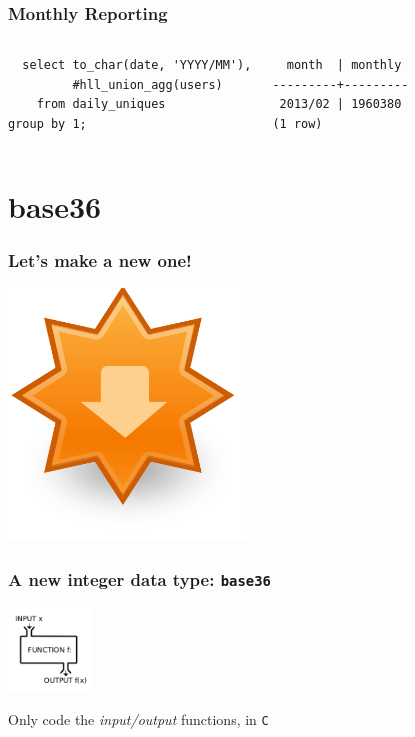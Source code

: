 \documentclass{beamer}
\begin{document}
\begin{frame}[fragile]
  \frametitle{Monthly Reporting}

\begin{columns}
\begin{verbatim}
  select to_char(date, 'YYYY/MM'),
         #hll_union_agg(users)
    from daily_uniques
group by 1;
\end{verbatim}  
\begin{verbatim}     
  month  | monthly 
---------+---------
 2013/02 | 1960380
(1 row)
\end{verbatim}  
\end{columns}
\end{frame}

\section{base36}

\begin{frame}[fragile]
  \frametitle{Let's make a new one!}

\begin{center}
  \includegraphics[height=18em]{extension-update.png}
\end{center}
\end{frame}

\begin{frame}[fragile]
  \frametitle{A new integer data type: \texttt{base36}}

  \vfill

  \begin{center}
    \includegraphics[height=6em]{input-output.png}
  \end{center}

  \begin{center}
    Only code the \textit{input/output} functions, in \texttt{C}
  \end{center}

\end{frame}
\end{document}
